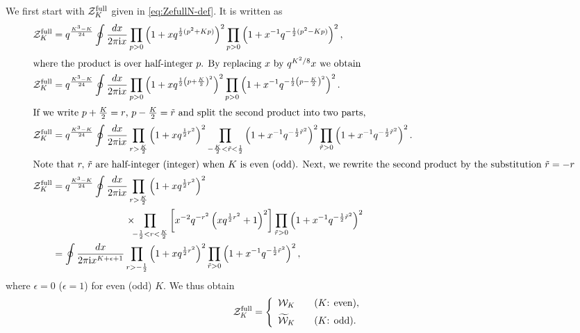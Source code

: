 \documentclass[11pt]{article}
\newcommand{\ri}{{\rm i}}
\newcommand{\hf}{\frac{1}{2}}
\def\til#1{\widetilde{#1}}
\newcommand{\nn}{\nonumber}
\renewcommand{\[}{\begin{eqnarray}}
\renewcommand{\]}{\end{eqnarray}}
\newcommand{\Zefull}{{\cal Z}^{\text{full}}}
\begin{document}
We first start with $\Zefull_K$ given in \eqref{eq:ZefullN-def}.
It is written as
%
\begin{align}
\Zefull_K
&=q^{\frac{K^3-K}{24}}\oint\frac{dx}{2\pi\ri x}
 \prod_{p>0}\left(1+xq^{\hf(p^2+Kp)}\right)^2
 \prod_{p>0}\left(1+x^{-1}q^{-\hf(p^2-Kp)}\right)^2,\nn\\
\intertext{where the product is over half-integer $p$.
By replacing $x$ by $q^{K^2/8}x$ we obtain}
\Zefull_K
&=q^{\frac{K^3-K}{24}}\oint\frac{dx}{2\pi\ri x}
 \prod_{p>0}\left(1+xq^{\hf\left(p+\frac{K}{2}\right)^2}\right)^2
 \prod_{p>0}
  \left(1+x^{-1}q^{-\hf\left(p-\frac{K}{2}\right)^2}\right)^2.\nn\\
\intertext{If we write
$p+\frac{K}{2}=r$, $p-\frac{K}{2}=\tilde{r}$ and split the second
 product into two parts,}
\Zefull_K
&=q^{\frac{K^3-K}{24}}\oint\frac{dx}{2\pi\ri x}
 \prod_{r>\frac{K}{2}}\left(1+xq^{\hf r^2}\right)^2
 \prod_{-\frac{K}{2}<\tilde{r}<\hf}
  \left(1+x^{-1}q^{-\hf \tilde{r}^2}\right)^2
 \prod_{\tilde{r}>0}\left(1+x^{-1}q^{-\hf \tilde{r}^2}\right)^2.\nn\\
\intertext{Note that $r,\,\tilde{r}$ are half-integer (integer)
when $K$ is even (odd).
Next, we rewrite the second product by the substitution $\tilde{r}=-r$}
\Zefull_K
&=q^{\frac{K^3-K}{24}}\oint\frac{dx}{2\pi\ri x}
 \prod_{r>\frac{K}{2}}\left(1+xq^{\hf r^2}\right)^2\nn\\
&\phantom{=q^{\frac{K^3-K}{24}}\oint\frac{dx}{2\pi\ri x}}
 \times\hspace{-.5em}\prod_{-\hf<r<\frac{K}{2}}
 \left[x^{-2}q^{-r^2}\left(xq^{\hf r^2}+1\right)^2\right]
 \prod_{\tilde{r}>0}\left(1+x^{-1}q^{-\hf \tilde{r}^2}\right)^2\nn\\
&=\oint\frac{dx}{2\pi\ri x^{K+\epsilon+1}}
 \prod_{r>-\hf}\left(1+xq^{\hf r^2}\right)^2
 \prod_{\tilde{r}>0}\left(1+x^{-1}q^{-\hf \tilde{r}^2}\right)^2,\nn
\end{align}
%
where $\epsilon=0$ ($\epsilon=1$) for even (odd) $K$.
We thus obtain
%
\begin{align}
\Zefull_K
&=\left\{\begin{array}{l}
\mathcal{W}_K \qquad \mbox{($K$: even)},\\[1ex]
\til{\mathcal{W}}_K \qquad \mbox{($K$: odd)}.
	 \end{array}\right.
\end{align}
%
\end{document}
